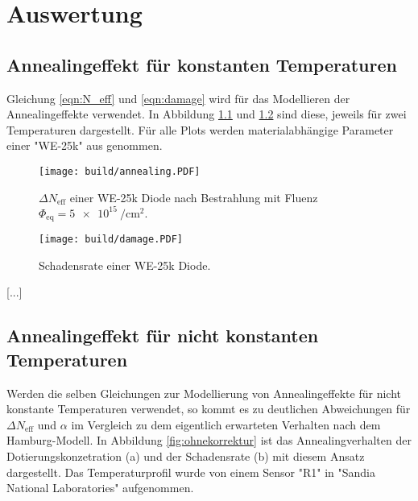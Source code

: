 \chapter{Auswertung}\label{make}
\section{Annealingeffekt für konstanten Temperaturen}
Gleichung \ref{eqn:N_eff} und \ref{eqn:damage}  wird für das Modellieren der Annealingeffekte verwendet. In
Abbildung \ref{fig:N_eff} und \ref{fig:damage} sind diese, jeweils für zwei Temperaturen dargestellt.
Für alle Plots werden materialabhängige
Parameter einer "WE-25k" aus \cite{moll} genommen.

\begin{figure}
    \texttt{[image: build/annealing.PDF]}
    \caption{$\Delta N_{\mathrm{eff}}$ einer WE-25k Diode nach Bestrahlung mit Fluenz $\Phi_{\mathrm{eq}} = \SI{5e15}{\per\centi\meter\squared}.$}
    \label{fig:N_eff}
\end{figure}

\begin{figure}
    \texttt{[image: build/damage.PDF]}
    \caption{Schadensrate einer WE-25k Diode.}
    \label{fig:damage}
\end{figure}

[...]



\section{Annealingeffekt für nicht konstanten Temperaturen}
Werden die selben Gleichungen zur Modellierung von Annealingeffekte für nicht
konstante Temperaturen verwendet, so kommt es zu deutlichen Abweichungen für
$\Delta N_{\mathrm{eff}}$ und $\alpha$ im Vergleich zu dem eigentlich erwarteten
Verhalten nach dem Hamburg-Modell. In Abbildung \ref{fig:ohnekorrektur} ist das Annealingverhalten
der Dotierungskonzetration (a) und der Schadensrate (b) mit
diesem Ansatz dargestellt. Das Temperaturprofil wurde von einem Sensor "R1" in
"Sandia National Laboratories" aufgenommen.


